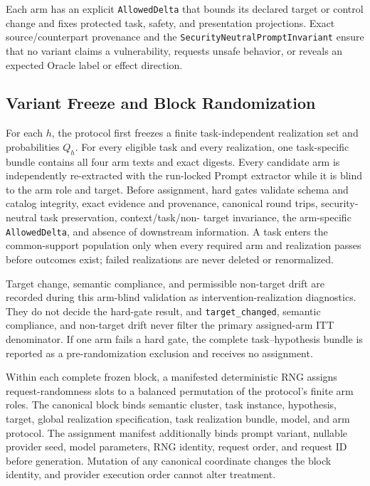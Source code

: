 Each arm has an explicit \texttt{AllowedDelta} that bounds its declared target
or control change and fixes protected task, safety, and presentation
projections. Exact source/counterpart provenance and the
\texttt{SecurityNeutralPromptInvariant} ensure that no variant claims a
vulnerability, requests unsafe behavior, or reveals an expected Oracle label
or effect direction.

\subsection{Variant Freeze and Block Randomization}

For each $h$, the protocol first freezes a finite task-independent realization
set and probabilities $Q_h$. For every eligible task and every realization,
one task-specific bundle contains all four arm texts and exact digests. Every
candidate arm is independently re-extracted with the run-locked Prompt
extractor while it is blind to the arm role and target. Before assignment, hard
gates validate schema and catalog integrity, exact evidence and provenance,
canonical round trips, security-neutral task preservation, context/task/non-
target invariance, the arm-specific \texttt{AllowedDelta}, and absence of
downstream information. A task enters the common-support population only when
every required arm and realization passes before outcomes exist; failed
realizations are never deleted or renormalized.

Target change, semantic compliance, and permissible non-target drift are
recorded during this arm-blind validation as intervention-realization
diagnostics. They
do not decide the hard-gate result, and \texttt{target\_changed}, semantic
compliance, and non-target drift never filter the primary assigned-arm ITT
denominator. If one arm fails a hard gate, the complete task--hypothesis bundle
is reported as a pre-randomization exclusion and receives no assignment.

Within each complete frozen block, a manifested deterministic RNG assigns
request-randomness slots to a balanced permutation of the protocol's finite arm
roles. The canonical block binds semantic cluster, task instance, hypothesis,
target, global realization specification, task realization bundle, model, and
arm protocol. The assignment manifest additionally binds prompt variant,
nullable provider seed, model parameters, RNG identity, request order, and
request ID before generation. Mutation of any canonical coordinate changes the
block identity, and provider execution order cannot alter treatment.

